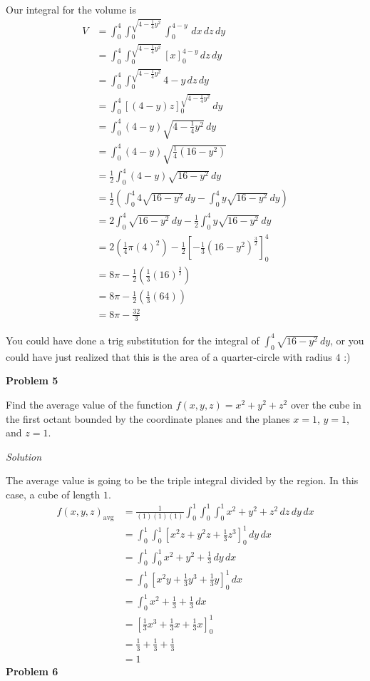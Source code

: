 \documentclass{article}
\newcommand{\lrp}[1]{\left( #1 \right)}
\newcommand{\lrb}[1]{\left[ #1 \right]}
\newcommand{\Solution}{\textit{Solution}}
\begin{document}
Our integral for the volume is
\begin{align*}
    V&=\int_0^4\int_0^{\sqrt{4-\frac{1}{4}y^2}}\int_0^{4-y}\,dx\,dz\,dy\\
    &=\int_0^4\int_0^{\sqrt{4-\frac{1}{4}y^2}}\lrb{x}_0^{4-y}\,dz\,dy\\
    &=\int_0^4\int_0^{\sqrt{4-\frac{1}{4}y^2}} 4-y\,dz\,dy\\
    &=\int_0^4 \lrb{(4-y)z}_0^{\sqrt{4-\frac{1}{4}y^2}}\,dy\\
    &=\int_0^4 (4-y)\sqrt{4-\frac{1}{4}y^2}\,dy\\
    &=\int_0^4(4-y)\sqrt{\frac{1}{4}\lrp{16-y^2}}\\
    &=\frac{1}{2}\int_0^4 (4-y)\sqrt{16-y^2}\,dy\\
    &=\frac{1}{2}\lrp{\int_0^4 4\sqrt{16-y^2}\,dy-\int_0^4 y\sqrt{16-y^2}\,dy}\\
    &=2\int_0^4\sqrt{16-y^2}\,dy-\frac{1}{2}\int_0^4 y\sqrt{16-y^2}\,dy\\
    &=2\lrp{\frac{1}{4}\pi(4)^2}-\frac{1}{2}\lrb{-\frac{1}{3}\lrp{16-y^2}^{\frac{3}{2}}}_0^4\\
    &=8\pi -\frac{1}{2}\lrp{\frac{1}{3}(16)^{\frac{3}{2}}}\\
    &=8\pi -\frac{1}{2}\lrp{\frac{1}{3}(64)}\\
    &=\boxed{8\pi-\frac{32}{3}}
\end{align*}

You could have done a trig substitution for the integral of $\displaystyle \int_0^4 \sqrt{16-y^2}\,dy$, or you could have just realized that this is the area of a quarter-circle with radius $4$ :)

\textbf{Problem 5}

Find the average value of the function $f(x,y,z)=x^2+y^2+z^2$ over the cube in the first octant bounded by the coordinate planes and the planes $x=1$, $y=1$, and $z=1$.

\Solution

The average value is going to be the triple integral divided by the region. In this case, a cube of length $1$.
\begin{align*}
    f(x,y,z)_{
    \text{avg}}&=\frac{1}{(1)(1)(1)}\int_0^1\int_0^1\int_0^1 x^2+y^2+z^2\,dz\,dy\,dx\\
    &=\int_0^1\int_0^1\lrb{x^2z+y^2z+\frac{1}{3}z^3}_0^1\,dy\,dx\\
    &=\int_0^1\int_0^1 x^2+y^2 +\frac{1}{3}\,dy\,dx\\
    &=\int_0^1\lrb{x^2y+\frac{1}{3}y^3+\frac{1}{3}y}_0^1\,dx\\
    &=\int_0^1 x^2 +\frac{1}{3}+\frac{1}{3}\,dx\\
    &=\lrb{\frac{1}{3}x^3+\frac{1}{3}x+\frac{1}{3}x}_0^1\\
    &=\frac{1}{3}+\frac{1}{3}+\frac{1}{3}\\
    &=\boxed{1}
\end{align*}
\textbf{Problem 6}
\end{document}
